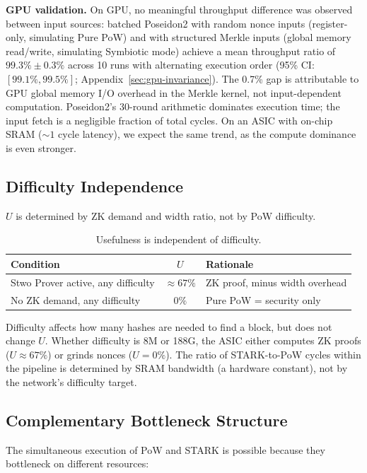 \documentclass[11pt,a4paper]{article}
\begin{document}
\textbf{GPU validation.} On GPU, no meaningful throughput difference was observed between input sources: batched Poseidon2 with random nonce inputs (register-only, simulating Pure PoW) and with structured Merkle inputs (global memory read/write, simulating Symbiotic mode) achieve a mean throughput ratio of $99.3\% \pm 0.3\%$ across 10 runs with alternating execution order (95\% CI: $[99.1\%, 99.5\%]$; Appendix~\ref{sec:gpu-invariance}). The 0.7\% gap is attributable to GPU global memory I/O overhead in the Merkle kernel, not input-dependent computation. Poseidon2's 30-round arithmetic dominates execution time; the input fetch is a negligible fraction of total cycles. On an ASIC with on-chip SRAM (${\sim}1$ cycle latency), we expect the same trend, as the compute dominance is even stronger.

\subsection{Difficulty Independence}

$U$ is determined by ZK demand and width ratio, not by PoW difficulty.

\begin{table}[h]
\centering
\begin{tabular}{@{}lcl@{}}
\toprule
Condition & $U$ & Rationale \\
\midrule
Stwo Prover active, any difficulty & $\approx 67\%$ & ZK proof, minus width overhead \\
No ZK demand, any difficulty & $0\%$ & Pure PoW = security only \\
\bottomrule
\end{tabular}
\caption{Usefulness is independent of difficulty.}
\label{tab:difficulty}
\end{table}

Difficulty affects how many hashes are needed to find a block, but does not change $U$. Whether difficulty is 8M or 188G, the ASIC either computes ZK proofs ($U \approx 67\%$) or grinds nonces ($U = 0\%$). The ratio of STARK-to-PoW cycles within the pipeline is determined by SRAM bandwidth (a hardware constant), not by the network's difficulty target.

\subsection{Complementary Bottleneck Structure}
\label{sec:bottleneck}

The simultaneous execution of PoW and STARK is possible because they bottleneck on different resources:
\end{document}
